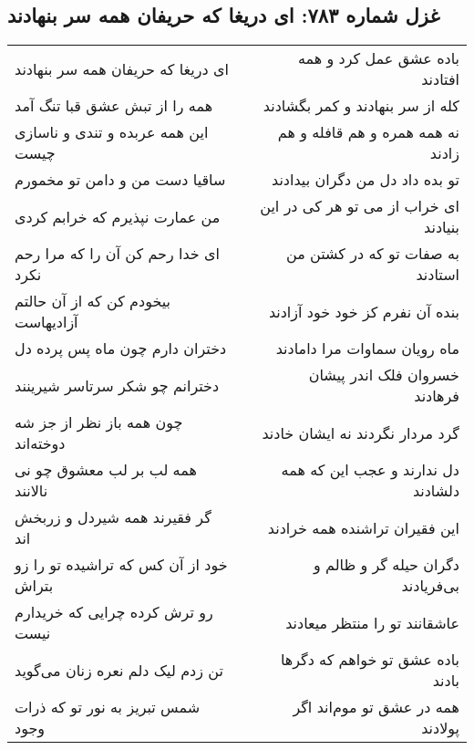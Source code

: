 \begin{center}
\section*{غزل شماره ۷۸۳: ای دریغا که حریفان همه سر بنهادند}
\label{sec:0783}
\begin{longtable}{l p{0.5cm} r}
ای دریغا که حریفان همه سر بنهادند
&&
باده عشق عمل کرد و همه افتادند
\\
همه را از تبش عشق قبا تنگ آمد
&&
کله از سر بنهادند و کمر بگشادند
\\
این همه عربده و تندی و ناسازی چیست
&&
نه همه همره و هم قافله و هم زادند
\\
ساقیا دست من و دامن تو مخمورم
&&
تو بده داد دل من دگران بیدادند
\\
من عمارت نپذیرم که خرابم کردی
&&
ای خراب از می تو هر کی در این بنیادند
\\
ای خدا رحم کن آن را که مرا رحم نکرد
&&
به صفات تو که در کشتن من استادند
\\
بیخودم کن که از آن حالتم آزادیهاست
&&
بنده آن نفرم کز خود خود آزادند
\\
دختران دارم چون ماه پس پرده دل
&&
ماه رویان سماوات مرا دامادند
\\
دخترانم چو شکر سرتاسر شیرینند
&&
خسروان فلک اندر پیشان فرهادند
\\
چون همه باز نظر از جز شه دوخته‌اند
&&
گرد مردار نگردند نه ایشان خادند
\\
همه لب بر لب معشوق چو نی نالانند
&&
دل ندارند و عجب این که همه دلشادند
\\
گر فقیرند همه شیردل و زربخش اند
&&
این فقیران تراشنده همه خرادند
\\
خود از آن کس که تراشیده تو را زو بتراش
&&
دگران حیله گر و ظالم و بی‌فریادند
\\
رو ترش کرده چرایی که خریدارم نیست
&&
عاشقانند تو را منتظر میعادند
\\
تن زدم لیک دلم نعره زنان می‌گوید
&&
باده عشق تو خواهم که دگرها بادند
\\
شمس تبریز به نور تو که ذرات وجود
&&
همه در عشق تو موم‌اند اگر پولادند
\\
\end{longtable}
\end{center}
